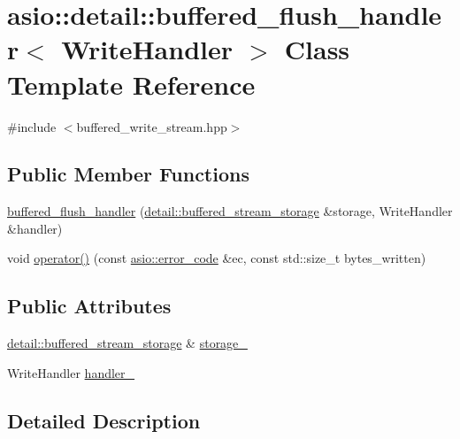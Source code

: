 \hypertarget{classasio_1_1detail_1_1buffered__flush__handler}{}\section{asio\+:\+:detail\+:\+:buffered\+\_\+flush\+\_\+handler$<$ Write\+Handler $>$ Class Template Reference}
\label{classasio_1_1detail_1_1buffered__flush__handler}


{\ttfamily \#include $<$buffered\+\_\+write\+\_\+stream.\+hpp$>$}

\subsection*{Public Member Functions}
\begin{DoxyCompactItemize}
\item 
\hyperlink{classasio_1_1detail_1_1buffered__flush__handler_a34d6e0fdefbb5aa8e6781be624cdcea7}{buffered\+\_\+flush\+\_\+handler} (\hyperlink{classasio_1_1detail_1_1buffered__stream__storage}{detail\+::buffered\+\_\+stream\+\_\+storage} \&storage, Write\+Handler \&handler)
\item 
void \hyperlink{classasio_1_1detail_1_1buffered__flush__handler_a1e8b8426c8c2f180937e74445878a1cc}{operator()} (const \hyperlink{classasio_1_1error__code}{asio\+::error\+\_\+code} \&ec, const std\+::size\+\_\+t bytes\+\_\+written)
\end{DoxyCompactItemize}
\subsection*{Public Attributes}
\begin{DoxyCompactItemize}
\item 
\hyperlink{classasio_1_1detail_1_1buffered__stream__storage}{detail\+::buffered\+\_\+stream\+\_\+storage} \& \hyperlink{classasio_1_1detail_1_1buffered__flush__handler_af3c17bfdba4ed3f2ce790665ef49faf1}{storage\+\_\+}
\item 
Write\+Handler \hyperlink{classasio_1_1detail_1_1buffered__flush__handler_a22590ea7765e35375d76e7fe39b48aff}{handler\+\_\+}
\end{DoxyCompactItemize}


\subsection{Detailed Description}
